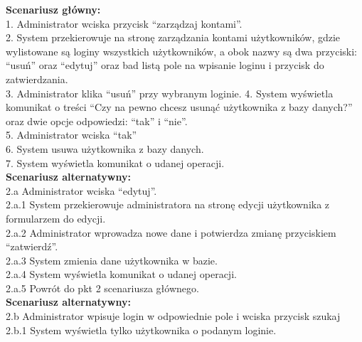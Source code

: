 \begin{enumerate}[label=(\Roman*)]
\textbf{Scenariusz główny:}\\
1. Administrator wciska przycisk “zarządzaj kontami”.\\
2. System przekierowuje na stronę zarządzania kontami użytkowników, gdzie
wylistowane są loginy wszystkich użytkowników, a obok nazwy są dwa przyciski:
“usuń” oraz “edytuj” oraz bad listą pole na wpisanie loginu i przycisk do
zatwierdzania.\\
3. Administrator klika “usuń” przy wybranym loginie.
4. System wyświetla komunikat o treści “Czy na pewno chcesz usunąć użytkownika z
bazy danych?” oraz dwie opcje odpowiedzi: “tak” i “nie”.\\
5. Administrator wciska “tak”\\
6. System usuwa użytkownika z bazy danych.\\
7. System wyświetla komunikat o udanej operacji.\\
\textbf{Scenariusz alternatywny:}\\
2.a Administrator wciska “edytuj”.\\
2.a.1 System przekierowuje administratora na stronę edycji użytkownika z formularzem do
edycji.\\
2.a.2 Administrator wprowadza nowe dane i potwierdza zmianę przyciskiem “zatwierdź”.\\
2.a.3 System zmienia dane użytkownika w bazie.\\
2.a.4 System wyświetla komunikat o udanej operacji.\\
2.a.5 Powrót do pkt 2 scenariusza głównego.\\
\textbf{Scenariusz alternatywny:}\\
2.b Administrator wpisuje login w odpowiednie pole i wciska przycisk szukaj\\
2.b.1 System wyświetla tylko użytkownika o podanym loginie.\\
\end{enumerate}